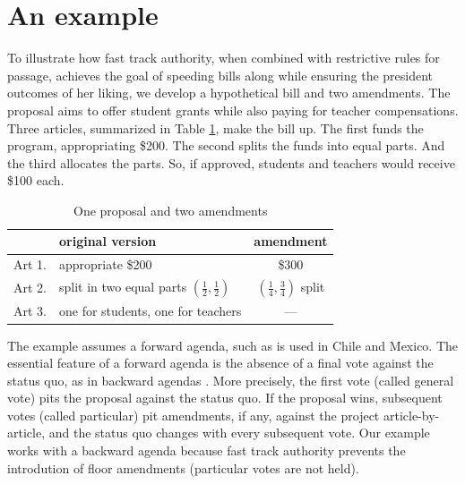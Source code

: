 \documentclass[letter,12pt]{article}
\begin{document}
\section{An example}

To illustrate how fast track authority, when combined with restrictive rules for passage, achieves the goal of speeding bills along while ensuring the president outcomes of her liking, we develop a hypothetical bill and two amendments. The proposal aims to offer student grants while also paying for teacher compensations. Three articles, summarized in Table \ref{T:example}, make the bill up. The first funds the program, appropriating \$200. The second splits the funds into equal parts. And the third allocates the parts. So, if approved, students and teachers would receive \$100 each. 

\begin{table}
\centering
\caption{One proposal and two amendments}\label{T:example}
\noindent \begin{tabular}{llc}
       & original version                   & amendment                                        \\ \hline
Art 1. & appropriate \$200                  & \$300                                            \\
Art 2. & split in two equal parts $(\frac{1}{2}, \frac{1}{2})$          & $(\frac{1}{4}, \frac{3}{4})$ split \\
Art 3. & one for students, one for teachers & ---                                              \\
\end{tabular}
\end{table}

The example assumes a forward agenda, such as is used in Chile and Mexico. The essential feature of a forward agenda is the absence of a final vote against the status quo, as in backward agendas \citep{heller.weldon.2003,schwartz.2008}. More precisely, the first vote (called general vote) pits the proposal against the status quo. If the proposal wins, subsequent votes (called particular) pit amendments, if any, against the project article-by-article, and the status quo changes with every subsequent vote. Our example works with a backward agenda because fast track authority prevents the introdution of floor amendments (particular votes are not held).  
\end{document}
